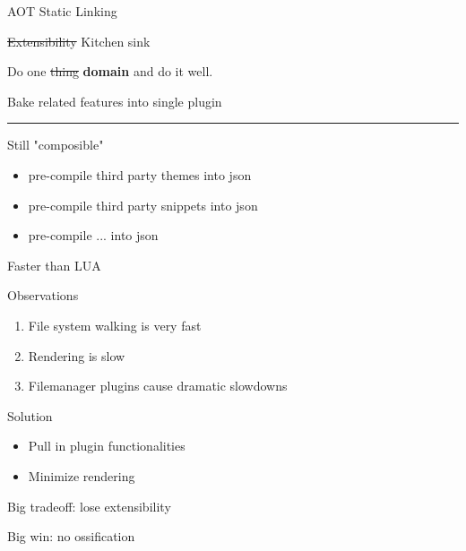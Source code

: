 \documentclass{beamer}
\begin{document}
\begin{frame}{AOT Static Linking}

	\begin{block}{\st{Extensibility} Kitchen sink}

		\vspace{0.5em}

		Do one \st{thing} \textbf{domain} and do it well.

		\vspace{0.5em}

	\end{block}

	Bake related features into single plugin

	\rule{\textwidth}{0.1em}

	Still "composible"

	\begin{itemize}

		\item pre-compile third party themes into json

		\item pre-compile third party snippets into json

		\item pre-compile ... into json

	\end{itemize}

\end{frame}


\begin{frame}{Faster than LUA}

	\begin{block}{Observations}

		\begin{enumerate}

			\item File system walking is very fast

			\item Rendering is slow

			\item Filemanager plugins cause dramatic slowdowns

		\end{enumerate}

	\end{block}

	\begin{block}{Solution}

		\begin{itemize}

			\item Pull in plugin functionalities

			\item Minimize rendering

		\end{itemize}

	\end{block}

	Big tradeoff: lose extensibility

	Big win: no ossification

\end{frame}
\end{document}
